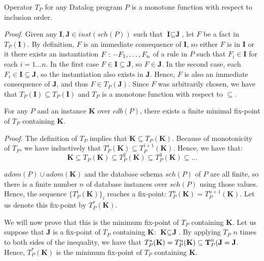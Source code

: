 \begin{lem}
Operator $T_P$ for any Datalog program $P$ is a monotone function with respect to inclusion order.
\end{lem}
\emph{Proof.} Given any $\textbf{I}, \textbf{J} \in inst(sch(P))$ such that $\textbf{I} \subseteq \textbf{J}$, let $F$ be a fact in $T_P(\textbf{I})$.
By definition, $F$ is an immediate consequence of $\textbf{I}$, so either $F$ is in $\textbf{I}$ or it there exists an instantiation
 $F :- F_1, \dots, F_n$ of a rule in $P$ such that $F_i \in \textbf{I}$ for each $i = 1\dots n$. 
In the first case $F \in \textbf{I} \subseteq \textbf{J}$, so $F \in \textbf{J}$. 
In the second case, each $F_i \in \textbf{I} \subseteq \textbf{J}$, so the instantiation also exists in $\textbf{J}$. 
Hence, $F$ is also an immediate consequence of $\textbf{J}$, and thus $F \in T_P(\textbf{J})$. 
Since $F$ was arbitrarily chosen, we have that $T_P(\textbf{I}) \subseteq T_P(\textbf{I})$ and $T_P$ is a monotone function with respect to $\subseteq$.

\begin{thm}
For any $P$ and an instance $\textbf{K}$ over $edb(P)$, there exists a finite minimal fix-point of $T_P$ containing $\textbf{K}$.
\end{thm}\label{t:datalogfixpointsem}
\emph{Proof.}
The definition of $T_P$ implies that $\textbf{K} \subseteq T_P(\textbf{K})$.
Because of monotonicity of $T_P$, we have inductively that $T_P^i(\textbf{K}) \subseteq T_P^{i+1}(\textbf{K})$.
Hence, we have that:
$$\textbf{K} \subseteq T_P(\textbf{K}) \subseteq T_P^2(\textbf{K}) \subseteq T_P^3(\textbf{K}) \subseteq \dots$$

$adom(P) \cup adom(\textbf{K})$ and the database schema $sch(P)$ of $P$ are all finite, so there is a finite number $n$ of database instances over $sch(P)$ using those values. Hence, the sequence $\{T_P^i(\textbf{K})\}_i$ reaches a fix-point: $T_P^n(\textbf{K}) = T_P^{n+1}(\textbf{K})$. Let us denote this fix-point by $T_P^*(\textbf{K})$.

We will now prove that this is the minimum fix-point of $T_P$ containing $\textbf{K}$. Let us suppose that $\textbf{J}$ is a fix-point of $T_P$ containing  $\textbf{K}$:  $\textbf{K} \subseteq \textbf{J}$. By applying $T_P$ $n$ times to both sides of the inequality, we have that $T_P^*(\textbf{K}) = T_P^n(\textbf{K}) \subseteq \textbf T_P^n(\textbf{J} = \textbf{J}$. Hence, $T_P^*(\textbf{K})$ is the minimum fix-point of $T_P$ containing $\textbf{K}$.


